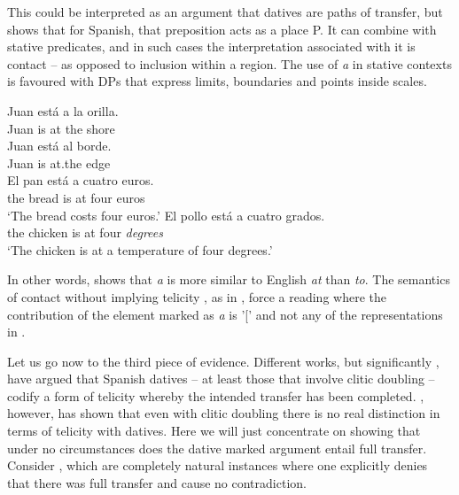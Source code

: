 \documentclass[output=paper,colorlinks,citecolor=brown,nonflat]{langsci/langscibook}
\begin{document}
This could be interpreted as an argument that datives are paths of transfer, but \citet{Fábregas2007} shows that for Spanish, that preposition acts as a place P. It can combine with stative predicates, and in such cases the interpretation associated with it is contact – as opposed to inclusion within a region. The use of \textit{a} in stative contexts is favoured with DPs that express limits, boundaries and points inside scales.

\ea%
    \label{ex:fabregas:22}
    \ea\label{ex:fabregas:22a}
    \gll    Juan está a   la    orilla.\\
            {Juan} {is}    {at} {the} {shore}\\
    \ex\label{ex:fabregas:22b}
    \gll    Juan está al      borde.\\
            {Juan} {is}    {at.the} {edge}\\
    \ex\label{ex:fabregas:22c}
    \gll    El   pan    está   a  cuatro   euros.\\
            {the} {bread} {is}   {at} {four}    {euros}\\
    \glt `The bread costs four euros.'  
    \ex\label{ex:fabregas:22d}
    \gll    El   pollo     está a cuatro grados.\\
            {the}  {chicken}   {is}    {at} {four}     \textit{degrees}\\
    \glt `The chicken is at a temperature of four degrees.' 
    \z
\z

In other words,  shows that \textit{a} is more similar to English \textit{at} than \textit{to}. The semantics of contact without implying telicity \citep{MarínMcNally2011}, as in , force a reading where the contribution of the element marked as \textit{a} is '[' and not any of the representations in . 

Let us go now to the third piece of evidence. Different works, but significantly \citet{RomeroMorales1997}, have argued that Spanish datives – at least those that involve clitic doubling – codify a form of telicity whereby the intended transfer has been completed. \citet{Pineda2016}, however, has shown that even with clitic doubling there is no real distinction in terms of telicity with datives. Here we will just concentrate on showing that under no circumstances does the dative marked argument entail full transfer. Consider , which are completely natural instances where one explicitly denies that there was full transfer and cause no contradiction. 
\end{document}
